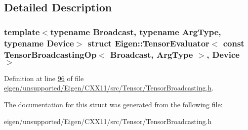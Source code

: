 \subsection{Detailed Description}
\subsubsection*{template$<$typename Broadcast, typename Arg\+Type, typename Device$>$\newline
struct Eigen\+::\+Tensor\+Evaluator$<$ const Tensor\+Broadcasting\+Op$<$ Broadcast, Arg\+Type $>$, Device $>$}



Definition at line \hyperlink{eigen_2unsupported_2_eigen_2_c_x_x11_2src_2_tensor_2_tensor_broadcasting_8h_source_l00096}{96} of file \hyperlink{eigen_2unsupported_2_eigen_2_c_x_x11_2src_2_tensor_2_tensor_broadcasting_8h_source}{eigen/unsupported/\+Eigen/\+C\+X\+X11/src/\+Tensor/\+Tensor\+Broadcasting.\+h}.



The documentation for this struct was generated from the following file\+:\begin{DoxyCompactItemize}
\item 
eigen/unsupported/\+Eigen/\+C\+X\+X11/src/\+Tensor/\+Tensor\+Broadcasting.\+h\end{DoxyCompactItemize}
